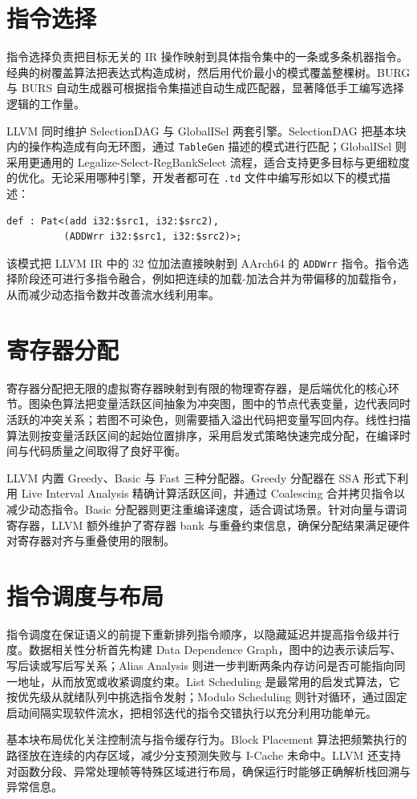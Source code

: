 \chapter{指令选择}
指令选择负责把目标无关的 IR 操作映射到具体指令集中的一条或多条机器指令。经典的树覆盖算法把表达式构造成树，然后用代价最小的模式覆盖整棵树。BURG 与 BURS 自动生成器可根据指令集描述自动生成匹配器，显著降低手工编写选择逻辑的工作量。\par
LLVM 同时维护 SelectionDAG 与 GlobalISel 两套引擎。SelectionDAG 把基本块内的操作构造成有向无环图，通过 \texttt{TableGen} 描述的模式进行匹配；GlobalISel 则采用更通用的 Legalize-Select-RegBankSelect 流程，适合支持更多目标与更细粒度的优化。无论采用哪种引擎，开发者都可在 \texttt{.td} 文件中编写形如以下的模式描述：\par
\begin{lstlisting}
def : Pat<(add i32:$src1, i32:$src2),
          (ADDWrr i32:$src1, i32:$src2)>;
\end{lstlisting}
该模式把 LLVM IR 中的 32 位加法直接映射到 AArch64 的 \texttt{ADDWrr} 指令。指令选择阶段还可进行多指令融合，例如把连续的加载-加法合并为带偏移的加载指令，从而减少动态指令数并改善流水线利用率。\par
\chapter{寄存器分配}
寄存器分配把无限的虚拟寄存器映射到有限的物理寄存器，是后端优化的核心环节。图染色算法把变量活跃区间抽象为冲突图，图中的节点代表变量，边代表同时活跃的冲突关系；若图不可染色，则需要插入溢出代码把变量写回内存。线性扫描算法则按变量活跃区间的起始位置排序，采用启发式策略快速完成分配，在编译时间与代码质量之间取得了良好平衡。\par
LLVM 内置 Greedy、Basic 与 Fast 三种分配器。Greedy 分配器在 SSA 形式下利用 Live Interval Analysis 精确计算活跃区间，并通过 Coalescing 合并拷贝指令以减少动态指令。Basic 分配器则更注重编译速度，适合调试场景。针对向量与谓词寄存器，LLVM 额外维护了寄存器 bank 与重叠约束信息，确保分配结果满足硬件对寄存器对齐与重叠使用的限制。\par
\chapter{指令调度与布局}
指令调度在保证语义的前提下重新排列指令顺序，以隐藏延迟并提高指令级并行度。数据相关性分析首先构建 Data Dependence Graph，图中的边表示读后写、写后读或写后写关系；Alias Analysis 则进一步判断两条内存访问是否可能指向同一地址，从而放宽或收紧调度约束。List Scheduling 是最常用的启发式算法，它按优先级从就绪队列中挑选指令发射；Modulo Scheduling 则针对循环，通过固定启动间隔实现软件流水，把相邻迭代的指令交错执行以充分利用功能单元。\par
基本块布局优化关注控制流与指令缓存行为。Block Placement 算法把频繁执行的路径放在连续的内存区域，减少分支预测失败与 I-Cache 未命中。LLVM 还支持对函数分段、异常处理帧等特殊区域进行布局，确保运行时能够正确解析栈回溯与异常信息。\par
